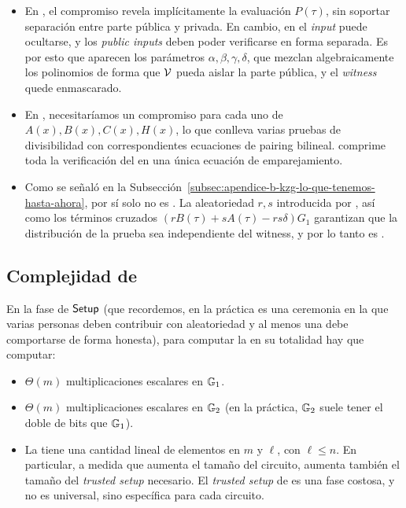 \begin{itemize}[itemsep=0.1cm]
	\item En \KZG, el compromiso revela implícitamente la evaluación $P(\tau)$, sin soportar separación entre parte pública y privada. En cambio, en \Groth el \textit{input} puede ocultarse, y los \textit{public inputs} deben poder verificarse en forma separada. Es por esto que aparecen los parámetros $\alpha, \beta, \gamma, \delta$, que mezclan algebraicamente los polinomios de forma que $\mathcal{V}$ pueda aislar la parte pública, y el \textit{witness} quede enmascarado.
	\item En \KZG, necesitaríamos un compromiso para cada uno de $A(x), B(x), C(x), H(x)$, lo que conlleva varias pruebas de divisibilidad con correspondientes ecuaciones de pairing bilineal. \Groth comprime toda la verificación del \QAP en una única ecuación de emparejamiento.
	\item Como se señaló en la Subsección~\ref{subsec:apendice-b-kzg-lo-que-tenemos-hasta-ahora}, \KZG por sí solo no es \ZK. La aleatoriedad $r, s$ introducida por \Groth, así como los términos cruzados $(rB(\tau) + sA(\tau) - rs\delta)G_1$ garantizan que la distribución de la prueba sea independiente del witness, y por lo tanto es \ZK.
\end{itemize}

\subsection{Complejidad de \Groth}
\label{subsec:apendice-b-groth16-complejidad-de-groth}

En la fase de $\mathsf{Setup}$ (que recordemos, en la práctica es una ceremonia en la que varias personas deben contribuir con aleatoriedad y al menos una debe comportarse de forma honesta), para computar la \SRS en su totalidad hay que computar:
\begin{itemize}[noitemsep]
	\item $\Theta(m)$ multiplicaciones escalares en $\mathbb{G}_1$.
	\item $\Theta(m)$ multiplicaciones escalares en $\mathbb{G}_2$ (en la práctica, $\mathbb{G}_2$ suele tener el doble de bits que $\mathbb{G}_1$).
	\item La \SRS tiene una cantidad lineal de elementos en $m$ y $\ell$, con $\ell \leq n$. En particular, a medida que aumenta el tamaño del circuito, aumenta también el tamaño del \textit{trusted setup} necesario. El \textit{trusted setup} de \Groth es una fase costosa, y no es universal, sino específica para cada circuito.
\end{itemize}

